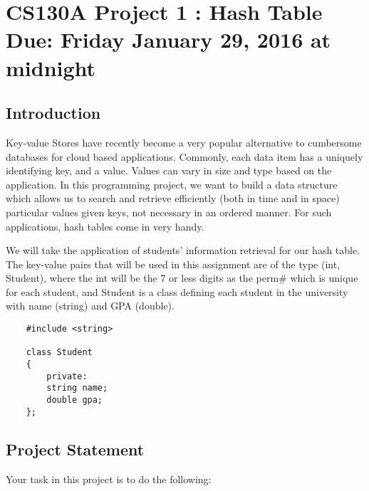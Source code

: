 \documentclass[times, 12pt]{article}
\begin{document}
\section*{CS130A Project 1 : Hash Table\\Due: Friday January 29, 2016 at midnight}

\subsection*{Introduction}
Key-value Stores have recently become a very popular alternative to cumbersome databases for
cloud based applications. Commonly, each data item has a uniquely identifying key, and a
value. Values can vary in size and type based on the application. In this programming
project, we want to build a data structure which allows us to search and retrieve efficiently (both in time and in space) particular values given keys, not necessary in an ordered manner. For such applications, hash tables come in very handy.

We will take the application of students' information retrieval for our hash table. The key-value pairs that will be used in this assignment are of the type (int, Student), where the int will be the 7 or less digits as the perm\# which is unique for each student, and Student is a class defining each student in the university with name (string) and GPA (double).

\begin{lstlisting}
    #include <string>
    
    class Student
    {
        private:
        string name;
        double gpa;
    };
\end{lstlisting}

\subsection*{Project Statement}
Your task in this project is to do the following:
\end{document}

